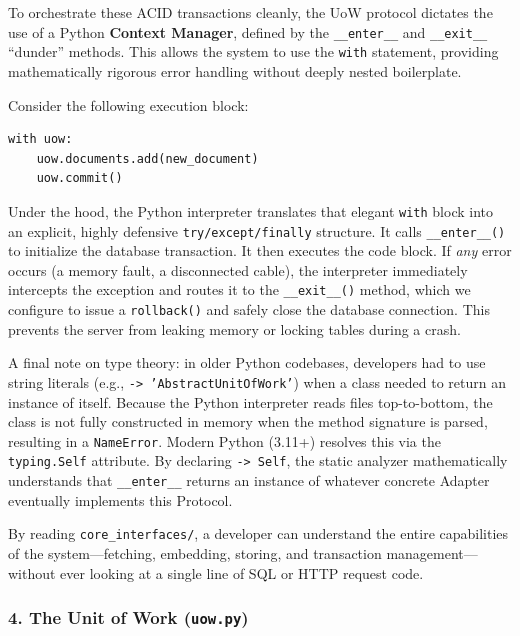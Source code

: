 To orchestrate these ACID transactions cleanly, the UoW protocol dictates the use of a Python \textbf{Context Manager}, defined by the \texttt{\_\_enter\_\_} and \texttt{\_\_exit\_\_} ``dunder'' methods. This allows the system to use the \texttt{with} statement, providing mathematically rigorous error handling without deeply nested boilerplate.

Consider the following execution block:
\begin{lstlisting}[caption={Context Manager Execution}]
with uow:
    uow.documents.add(new_document)
    uow.commit()
\end{lstlisting}

Under the hood, the Python interpreter translates that elegant \texttt{with} block into an explicit, highly defensive \texttt{try/except/finally} structure. It calls \texttt{\_\_enter\_\_()} to initialize the database transaction. It then executes the code block. If \textit{any} error occurs (a memory fault, a disconnected cable), the interpreter immediately intercepts the exception and routes it to the \texttt{\_\_exit\_\_()} method, which we configure to issue a \texttt{rollback()} and safely close the database connection. This prevents the server from leaking memory or locking tables during a crash.

A final note on type theory: in older Python codebases, developers had to use string literals (e.g., \texttt{-> 'AbstractUnitOfWork'}) when a class needed to return an instance of itself. Because the Python interpreter reads files top-to-bottom, the class is not fully constructed in memory when the method signature is parsed, resulting in a \texttt{NameError}. Modern Python (3.11+) resolves this via the \texttt{typing.Self} attribute. By declaring \texttt{-> Self}, the static analyzer mathematically understands that \texttt{\_\_enter\_\_} returns an instance of whatever concrete Adapter eventually implements this Protocol.

By reading \texttt{core\_interfaces/}, a developer can understand the entire capabilities of the system---fetching, embedding, storing, and transaction management---without ever looking at a single line of SQL or HTTP request code.








\subsubsection*{4. The Unit of Work (\texttt{uow.py})}

